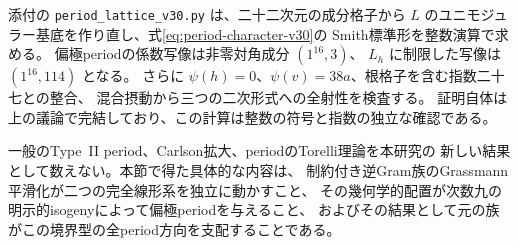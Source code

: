 添付の \texttt{period\_lattice\_v30.py} は、二十二次元の成分格子から
$L$ のユニモジュラー基底を作り直し、式\eqref{eq:period-character-v30}の
Smith標準形を整数演算で求める。
偏極periodの係数写像は非零対角成分 $(1^{16},3)$、
$L_h$ に制限した写像は $(1^{16},114)$ となる。
さらに $\psi(h)=0$、$\psi(v)=38a$、根格子を含む指数二十七との整合、
混合摂動から三つの二次形式への全射性を検査する。
証明自体は上の議論で完結しており、この計算は整数の符号と指数の独立な確認である。

一般のType~II period、Carlson拡大、periodのTorelli理論を本研究の
新しい結果として数えない。本節で得た具体的な内容は、
制約付き逆Gram族のGrassmann平滑化が二つの完全線形系を独立に動かすこと、
その幾何学的配置が次数九の明示的isogenyによって偏極periodを与えること、
およびその結果として元の族がこの境界型の全period方向を支配することである。
